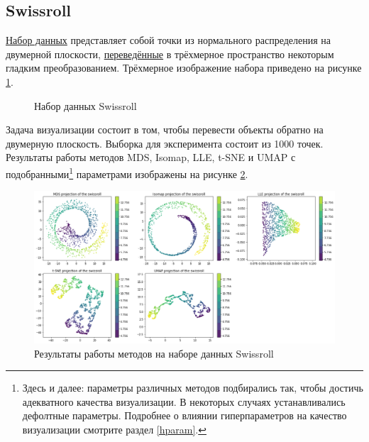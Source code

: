\documentclass[10pt, a4paper]{extarticle}
\begin{document}
\subsection{Swissroll}
\href{https://scikit-learn.org/stable/modules/generated/sklearn.datasets.make_swiss_roll.html}{Набор данных} представляет собой точки из нормального распределения на двумерной плоскости, \href{http://people.cs.uchicago.edu/~dinoj/manifold/swissroll.html}{переведённые} в трёхмерное пространство некоторым гладким преобразованием.
Трёхмерное изображение набора приведено на рисунке \ref{fig:swissroll}.
\begin{figure}[h!]
    \centering
    \caption{Набор данных Swissroll}
    \label{fig:swissroll}
\end{figure}

Задача визуализации состоит в том, чтобы перевести объекты обратно на двумерную плоскость. Выборка для эксперимента состоит из 1000 точек. Результаты работы методов MDS, Isomap, LLE, t-SNE и UMAP с подобранными\footnote{Здесь и далее: параметры различных методов подбирались так, чтобы достичь адекватного качества визуализации. В некоторых случаях устанавливались дефолтные параметры. Подробнее о влиянии гиперпараметров на качество визуализации смотрите раздел \ref{hparam}.} параметрами изображены на рисунке \ref{fig:resutls_swissroll}.
\begin{figure}[h!]
    \vspace{1em}
    \centering
    \includegraphics[width=\linewidth]{swissroll_methods.png}
    \caption{Результаты работы методов на наборе данных Swissroll}
    \label{fig:resutls_swissroll}
\end{figure}
\end{document}

